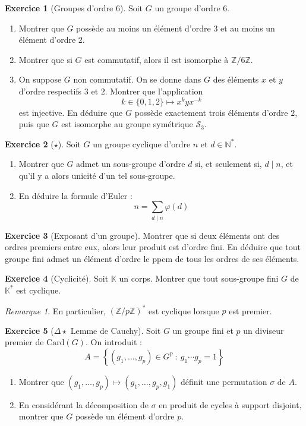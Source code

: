 \documentclass[french]{book}
\newcommand{\N}{\mathbb{N}}
\newcommand{\Z}{\mathbb{Z}}
\newcommand{\K}{\mathbb{K}}
\newcommand{\st}{^*}
\newcommand{\card}{\text{Card}}
\theoremstyle{definition}
\newtheorem{ex}{Exercice}[chapter]
\theoremstyle{theorem}
\theoremstyle{remark}
\newtheorem*{rmq}{Remarque}
\begin{document}
\begin{ex}[Groupes d'ordre 6]
	Soit $G$ un groupe d'ordre $6$.
	\begin{enumerate}
		\item Montrer que $G$ possède au moins un élément d'ordre $3$ et au moins un élément d'ordre $2$.
		\item Montrer que si $G$ est commutatif, alors il est isomorphe à $\Z/6\Z$.
		\item On suppose $G$ non commutatif. On se donne dans $G$ des éléments $x$ et $y$ d'ordre respectifs $3$ et $2$. Montrer que l'application $$k\in\{0,1,2\}\mapsto x^kyx^{-k}$$ est injective. En déduire que $G$ possède exactement trois éléments d'ordre $2$, puis que $G$ est isomorphe au groupe symétrique $\mathcal{S}_3$.
	\end{enumerate}
\end{ex}

\begin{ex}[$\star$]
	Soit $G$ un groupe cyclique d'ordre $n$ et $d\in\N\st$.
	\begin{enumerate}
		\item Montrer que $G$ admet un sous-groupe d'ordre $d$ si, et seulement si, $d\mid n$, et qu'il y a alors unicité d'un tel sous-groupe.
		\item En déduire la formule d'Euler : $$n=\sum_{d\mid n}\varphi(d)$$
	\end{enumerate}
\end{ex}

\begin{ex}[Exposant d'un groupe]
	Montrer que si deux éléments ont des ordres premiers entre eux, alors leur produit est d'ordre fini. En déduire que tout groupe fini admet un élément d'ordre le ppcm de tous les ordres de ses éléments.
\end{ex}

\begin{ex}[Cyclicité]
	Soit $\K$ un corps. Montrer que tout sous-groupe fini $G$ de $\K\st$ est cyclique.
\end{ex}

\begin{rmq}
	En particulier, $(\Z/p\Z)\st$ est cyclique lorsque $p$ est premier.
\end{rmq}

\begin{ex}[$\Delta\star$ Lemme de Cauchy]
	Soit $G$ un groupe fini et $p$ un diviseur premier de $\card(G)$. On introduit : $$A=\left\{(g_1,\ldots,g_p)\in G^p\ : \ g_1\cdots g_p=1\right\}$$
	\begin{enumerate}
		\item Montrer que $(g_1,\ldots,g_p)\mapsto(g_1,\ldots,g_p,g_1)$ définit une permutation $\sigma$ de $A$.
		\item En considérant la décomposition de $\sigma$ en produit de cycles à support disjoint, montrer que $G$ possède un élément d'ordre $p$.
	\end{enumerate}
\end{ex}
\end{document}
